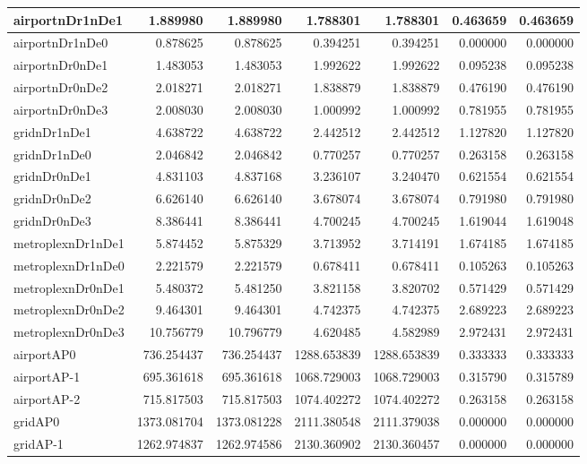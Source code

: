 \begin{longtable}{|l|r|r|r|r|r|r|}
\endlastfoot
airportnDr1nDe1 & 1.889980 & 1.889980 & 1.788301 & 1.788301 & 0.463659 & 0.463659 \\ \hline
airportnDr1nDe0 & 0.878625 & 0.878625 & 0.394251 & 0.394251 & 0.000000 & 0.000000 \\ \hline
airportnDr0nDe1 & 1.483053 & 1.483053 & 1.992622 & 1.992622 & 0.095238 & 0.095238 \\ \hline
airportnDr0nDe2 & 2.018271 & 2.018271 & 1.838879 & 1.838879 & 0.476190 & 0.476190 \\ \hline
airportnDr0nDe3 & 2.008030 & 2.008030 & 1.000992 & 1.000992 & 0.781955 & 0.781955 \\ \hline
gridnDr1nDe1 & 4.638722 & 4.638722 & 2.442512 & 2.442512 & 1.127820 & 1.127820 \\ \hline
gridnDr1nDe0 & 2.046842 & 2.046842 & 0.770257 & 0.770257 & 0.263158 & 0.263158 \\ \hline
gridnDr0nDe1 & 4.831103 & 4.837168 & 3.236107 & 3.240470 & 0.621554 & 0.621554 \\ \hline
gridnDr0nDe2 & 6.626140 & 6.626140 & 3.678074 & 3.678074 & 0.791980 & 0.791980 \\ \hline
gridnDr0nDe3 & 8.386441 & 8.386441 & 4.700245 & 4.700245 & 1.619044 & 1.619048 \\ \hline
metroplexnDr1nDe1 & 5.874452 & 5.875329 & 3.713952 & 3.714191 & 1.674185 & 1.674185 \\ \hline
metroplexnDr1nDe0 & 2.221579 & 2.221579 & 0.678411 & 0.678411 & 0.105263 & 0.105263 \\ \hline
metroplexnDr0nDe1 & 5.480372 & 5.481250 & 3.821158 & 3.820702 & 0.571429 & 0.571429 \\ \hline
metroplexnDr0nDe2 & 9.464301 & 9.464301 & 4.742375 & 4.742375 & 2.689223 & 2.689223 \\ \hline
metroplexnDr0nDe3 & 10.756779 & 10.796779 & 4.620485 & 4.582989 & 2.972431 & 2.972431 \\ \hline
airportAP0 & 736.254437 & 736.254437 & 1288.653839 & 1288.653839 & 0.333333 & 0.333333 \\ \hline
airportAP-1 & 695.361618 & 695.361618 & 1068.729003 & 1068.729003 & 0.315790 & 0.315789 \\ \hline
airportAP-2 & 715.817503 & 715.817503 & 1074.402272 & 1074.402272 & 0.263158 & 0.263158 \\ \hline
gridAP0 & 1373.081704 & 1373.081228 & 2111.380548 & 2111.379038 & 0.000000 & 0.000000 \\ \hline
gridAP-1 & 1262.974837 & 1262.974586 & 2130.360902 & 2130.360457 & 0.000000 & 0.000000 \\ \hline

\end{longtable}

